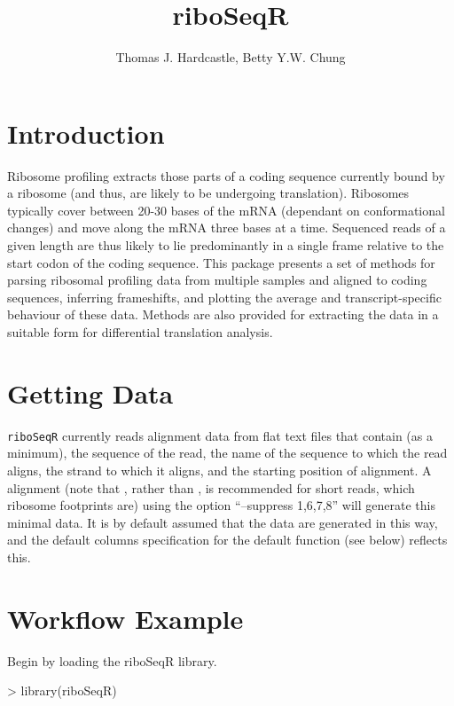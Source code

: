 \documentclass[a4paper]{article}
\title{riboSeqR}
\author{Thomas J. Hardcastle, Betty Y.W. Chung}
\begin{document}
\maketitle

\section*{Introduction}

Ribosome profiling extracts those parts of a coding sequence currently bound by a ribosome (and thus, are likely to be undergoing translation). Ribosomes typically cover between 20-30 bases of the mRNA (dependant on conformational changes) and move along the mRNA three bases at a time. Sequenced reads of a given length are thus likely to lie predominantly in a single frame relative to the start codon of the coding sequence. This package presents a set of methods for parsing ribosomal profiling data from multiple samples and aligned to coding sequences, inferring frameshifts, and plotting the average and transcript-specific behaviour of these data. Methods are also provided for extracting the data in a suitable form for differential translation analysis.

\section*{Getting Data}

\verb'riboSeqR' currently reads alignment data from flat text files that contain (as a minimum), the sequence of the read, the name of the sequence to which the read aligns, the strand to which it aligns, and the starting position of alignment. A  alignment (note that , rather than , is recommended for short reads, which ribosome footprints are) using the option ``--suppress 1,6,7,8'' will generate this minimal data. It is by default assumed that the data are generated in this way, and the default columns specification for the default  function (see below) reflects this.

\section*{Workflow Example}

Begin by loading the riboSeqR library.

\begin{Schunk}
\begin{Sinput}
> library(riboSeqR)
\end{Sinput}
\end{Schunk}
\end{document}

